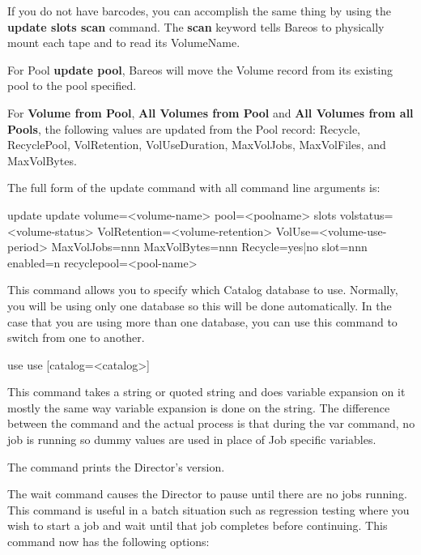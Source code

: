 \begin{description}
   If you do not have barcodes, you can accomplish the same thing
   by using the {\bf update slots scan} command.
   The {\bf scan} keyword tells Bareos to physically mount each tape and to
   read its VolumeName.

   For Pool {\bf update pool}, Bareos will move the Volume record from its
   existing pool to the pool specified.

   For {\bf Volume from Pool}, {\bf All Volumes from Pool} and {\bf All Volumes
     from all Pools}, the following values are updated from the Pool record:
   Recycle, RecyclePool, VolRetention, VolUseDuration, MaxVolJobs, MaxVolFiles,
   and MaxVolBytes.

   The full form of the update command with all command line arguments is:

\begin{bconsole}{update}
update volume=<volume-name> pool=<poolname>
  slots volstatus=<volume-status> VolRetention=<volume-retention>
  VolUse=<volume-use-period> MaxVolJobs=nnn MaxVolBytes=nnn Recycle=yes|no
  slot=nnn enabled=n recyclepool=<pool-name>
\end{bconsole}


\item [use]
   This command allows you to specify which Catalog  database to use. Normally,
   you will be using only one database so  this will be done automatically. In
   the case that you are using  more than one database, you can use this command
   to switch from  one to another.

\begin{bconsole}{use}
use [catalog=<catalog>]
\end{bconsole}

\item [var]
   \label{var}
   This command takes a string or quoted string and does variable expansion on
   it mostly the same way variable expansion is done on the  string.
   The difference  between the  command and the actual  process
   is that during the var command, no job is running so dummy values are
   used in place of Job specific variables.

\item [version]
   The command prints the Director's version.

\item [wait]
   The wait command causes the Director to pause  until there are no jobs
   running. This command is useful in  a batch situation such as regression
   testing where you  wish to start a job and wait until that job completes
   before continuing. This command now has the following options:


\end{description}
